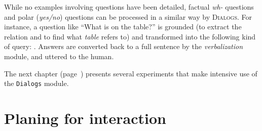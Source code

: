  
While no examples involving questions have been detailed, factual \emph{wh-}
questions and polar (\emph{yes/no}) questions can be processed in a similar way
by \textsc{Dialogs}. For instance, a question like ``What is on the table?'' is
grounded (to extract the relation  and to find what \emph{table}
refers to) and transformed into the following kind of query: .  Answers are converted back to a full sentence by
the \emph{verbalization} module, and uttered to the human.


The next chapter (page~\pageref{chapter|evaluation}) presents several
experiments that make intensive use of the {\tt Dialogs} module.

\section{Planing for interaction}
\label{sect|planing-for-interaction}


